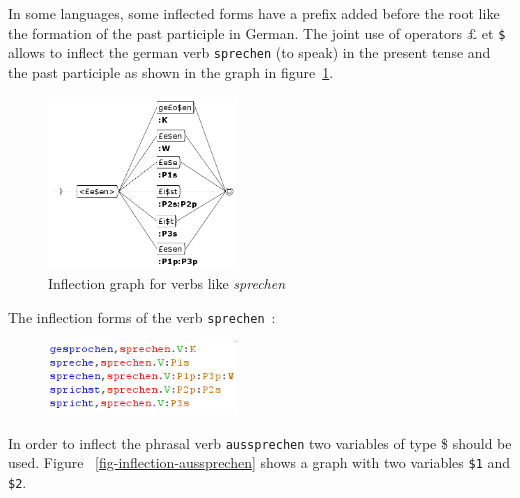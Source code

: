 \noindent  In some languages, some inflected forms have a prefix added before the root like the formation of the past participle in German. The joint use of operators
${\pounds}$ et \verb+$+ allows to inflect the german verb \verb+sprechen+ (to speak)
in the present tense and the past participle as shown in the graph in figure~\ref{fig-inflection-sprechen}.

\newpage
\begin{figure}[!htbp]
\begin{center}
\includegraphics[width=5cm]{resources/img/fig3-Advanced_operators_with_Variables-V_sprechen.png}
\caption{Inflection graph for verbs like {\it sprechen}
\label{fig-inflection-sprechen}}
\end{center}
\end{figure}

\noindent The inflection forms of the verb \verb+sprechen+~:

\bigskip
\begin{figure}[!ht]
\begin{center}
\includegraphics[width=5cm]{resources/img/fig3-flexion_sprechen.png}
\end{center}
\end{figure}

\noindent In order to inflect the phrasal verb  \verb+aussprechen+  two variables of type \$ should be used.
Figure ~\ref{fig-inflection-aussprechen} shows a graph with two variables \verb+$1+ and \verb+$2+.

